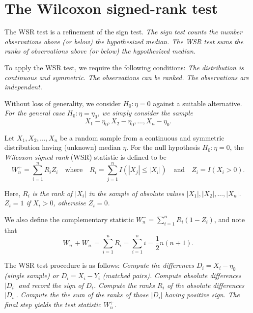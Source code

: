 \section{The Wilcoxon signed-rank test}
The WSR test is a refinement of the sign test.
\bit
\it The sign test counts the number observations above (or below) the hypothesized median.
\it The WSR test sums the ranks of observations above (or below) the hypothesized median.
\eit

\vspace*{3ex}
To apply the WSR test, we require the following conditions:
\ben
\it The distribution is continuous and symmetric.
\it The observations can be ranked.
\it The observations are independent.
\een


\vspace*{3ex}
Without loss of generality, we consider $H_0:\eta=0$ against a suitable alternative.
\bit
\it For the general case $H_0:\eta=\eta_0$, we simply consider the sample 
\[
X_1-\eta_0,X_2-\eta_0,\ldots,X_n-\eta_0.
\]
\eit


\begin{definition}
Let $X_1,X_2,\ldots,X_n$ be a random sample from a continuous and symmetric distribution having (unknown) median $\eta$. For the null hypothesis $H_0:\eta=0$, the \emph{Wilcoxon signed rank} (WSR) statistic is defined to be
\[
W^{+}_n = \sum_{i=1}^n R_i Z_i \quad\text{where}\quad R_i = \sum_{j=1}^n I(|X_j|\leq |X_i|) \quad\text{and}\quad Z_i=I(X_i>0).
\]
\end{definition}

Here,
\bit
\it $R_i$ is the rank of $|X_i|$ in the sample of absolute values $|X_1|,|X_2|,\ldots,|X_n|$.
\it $Z_i=1$ if $X_i>0$, otherwise $Z_i=0$.
\eit

We also define the complementary statistic $W^{-}_n = \displaystyle\sum_{i=1}^n R_i(1-Z_i)$, and note that
\[
W^{+}_n + W^{-}_n = \sum_{i=1}^n R_i = \sum_{i=1}^n i = \frac{1}{2}n(n+1).
\]


The WSR test procedure is as follows:
\ben
\it Compute the differences $D_i = X_i - \eta_0$ (single sample) or $D_i=X_i-Y_i$ (matched pairs).
\it Compute absolute differences $|D_i|$ and record the sign of $D_i$.
\it Compute the ranks $R_i$ of the absolute differences $|D_i|$.
\it Compute the the sum of the ranks of those $|D_i|$ having positive sign. 
\een
The final step yields the test statistic $W^{+}_n$.

